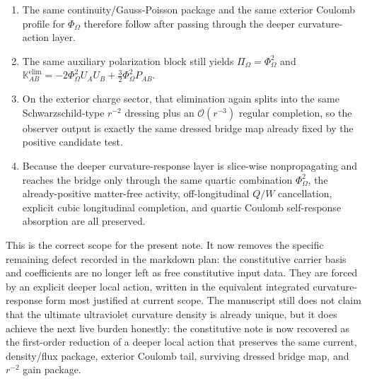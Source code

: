 \documentclass[11pt]{article}
\newcommand{\ProjSub}{P}
\newcommand{\FlowPot}{\Phi_\Omega}
\newcommand{\BalanceField}{\Pi_\Omega}
\newcommand{\SourceDensityRed}{\varrho_\Omega^{\mathrm{red}}}
\newcommand{\AuxPol}{\mathbb K}
\begin{document}
\begin{enumerate}
\[    =
    \SourceDensityRed,
    \]
    and it carries the same Hamiltonian charge by the same asymptotic current flux.
    \item The same continuity/Gauss-Poisson package and the same exterior Coulomb profile for \(\FlowPot\) therefore follow after passing through the deeper curvature-action layer.
    \item The same auxiliary polarization block still yields \(\BalanceField=\FlowPot^2\) and \(\AuxPol_{AB}^{\mathrm{elim}}=-2\FlowPot^2U_AU_B+\tfrac32\FlowPot^2\ProjSub_{AB}\).
    \item On the exterior charge sector, that elimination again splits into the same Schwarzschild-type \(r^{-2}\) dressing plus an \(\mathcal O(r^{-3})\) regular completion, so the observer output is exactly the same dressed bridge map already fixed by the positive candidate test.
    \item Because the deeper curvature-response layer is slice-wise nonpropagating and reaches the bridge only through the same quartic combination \(\FlowPot^2\), the already-positive matter-free activity, off-longitudinal \(Q/W\) cancellation, explicit cubic longitudinal completion, and quartic Coulomb self-response absorption are all preserved.
\end{enumerate}

This is the correct scope for the present note. It now removes the specific remaining defect recorded in the markdown plan: the constitutive carrier basis and coefficients are no longer left as free constitutive input data. They are forced by an explicit deeper local action, written in the equivalent integrated curvature-response form most justified at current scope. The manuscript still does not claim that the ultimate ultraviolet curvature density is already unique, but it does achieve the next live burden honestly: the constitutive note is now recovered as the first-order reduction of a deeper local action that preserves the same current, density/flux package, exterior Coulomb tail, surviving dressed bridge map, and \(r^{-2}\) gain package.
\end{document}

